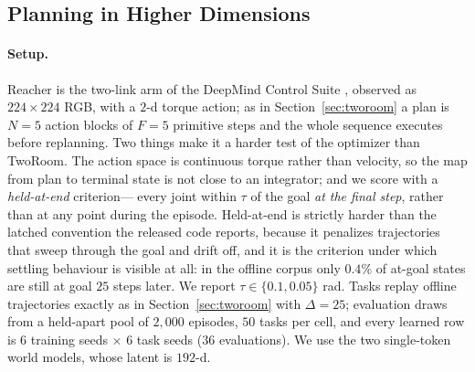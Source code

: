 %
%
%

\subsection{Planning in Higher Dimensions}
\label{sec:highdim}

\paragraph{Setup.}
Reacher is the two-link arm of the DeepMind Control Suite
\citep{tassa2018deepmind}, observed as $224\times224$ RGB, with a $2$-d torque
action; as in Section~\ref{sec:tworoom} a plan is $N=5$ action blocks of
$F=5$ primitive steps and the whole sequence executes before replanning. Two
things make it a harder test of the optimizer than TwoRoom. The action space is
continuous torque rather than velocity, so the map from plan to terminal state is
not close to an integrator; and we score with a \emph{held-at-end} criterion---
every joint within $\tau$ of the goal \emph{at the final step}, rather than at
any point during the episode. Held-at-end is strictly harder than the latched
convention the released code reports, because it penalizes trajectories that
sweep through the goal and drift off, and it is the criterion under which
settling behaviour is visible at all: in the offline corpus only $0.4\%$ of
at-goal states are still at goal $25$ steps later. We report
$\tau \in \{0.1, 0.05\}$ rad. Tasks replay offline trajectories exactly as in
Section~\ref{sec:tworoom} with $\Delta = 25$; evaluation draws from a
held-apart pool of $2{,}000$ episodes, $50$ tasks per cell, and every learned
row is $6$ training seeds $\times$ $6$ task seeds ($36$ evaluations). We use the
two single-token world models, whose latent is $192$-d.

